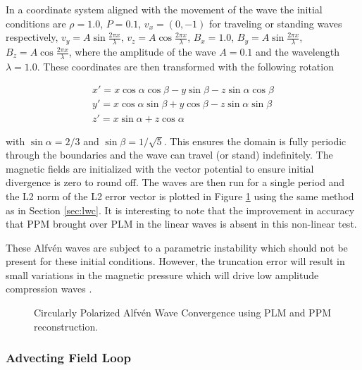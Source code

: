 In a coordinate system aligned with the movement of the wave the initial conditions are 
$\rho = 1.0$,
$P = 0.1$,
$v_x = (0,-1)$ for traveling or standing waves respectively,
$v_y = A \sin{\frac{2\pi x}{\lambda}}$,
$v_z = A \cos{\frac{2\pi x}{\lambda}}$,
$B_x = 1.0$,
$B_y = A \sin{\frac{2\pi x}{\lambda}}$,
$B_z = A \cos{\frac{2\pi x}{\lambda}}$,
where the amplitude of the wave $A = 0.1$ and the wavelength $\lambda = 1.0$. These coordinates are then transformed with the following rotation

\begin{eqnarray}
    x\prime = x \cos\alpha\cos\beta - y \sin\beta - z \sin\alpha\cos\beta \nonumber \\
    y\prime = x \cos\alpha\sin\beta + y \cos\beta - z \sin\alpha\sin\beta \nonumber \\
    z\prime = x \sin\alpha + z \cos\alpha \nonumber
\end{eqnarray}

\noindent with $\sin\alpha = 2/3$ and $\sin\beta = 1/\sqrt{5}$. This ensures the domain is fully periodic through the boundaries and the wave can travel (or stand) indefinitely. The magnetic fields are initialized with the vector potential to ensure initial divergence is zero to round off. The waves are then run for a single period and the L2 norm of the L2 error vector is plotted in Figure \ref{fig:cpaw} using the same method as in Section \ref{sec:lwc}. It is interesting to note that the improvement in accuracy that PPM brought over PLM in the linear waves is absent in this non-linear test.

These Alfv\'en waves are subject to a parametric instability \citep{del_zanna_parametric_2001} which should not be present for these initial conditions. However, the truncation error will result in small variations in the magnetic pressure which will drive low amplitude compression waves \citep{stone_athena_2008}. 

\begin{figure}[ht!]
    \caption{Circularly Polarized Alfv\'en Wave Convergence using PLM and PPM reconstruction. }
    \label{fig:cpaw}
\end{figure}

\subsubsection{Advecting Field Loop}
\label{sec:afl}

